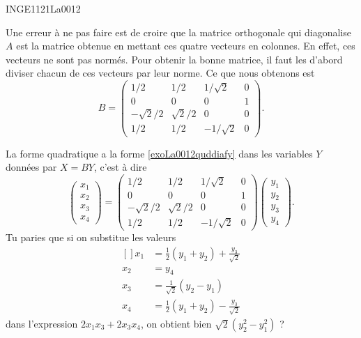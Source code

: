 \begin{corrige}{INGE1121La0012}
\begin{enumerate}
			Une erreur à ne pas faire est de croire que la matrice orthogonale qui diagonalise $A$ est la matrice obtenue en mettant ces quatre vecteurs en colonnes. En effet, ces vecteurs ne sont pas normés. Pour obtenir la bonne matrice, il faut les d'abord diviser chacun de ces vecteurs par leur norme. Ce que nous obtenons est
			\begin{equation}
				B=\begin{pmatrix}
					1/2	&	1/2	&	1/\sqrt{2}	&	0	\\
					 0	&	0	&	0	&	1	\\
					 -\sqrt{2}/2	&	\sqrt{2}/2	&	0	&	0	\\ 
					 1/2	&	1/2	&	-1/\sqrt{2}	&	0	 
				 \end{pmatrix}.
			\end{equation}
			
			La forme quadratique a la forme \eqref{exoLa0012quddiafy} dans les variables $Y$ données par $X=BY$, c'est à dire
			\begin{equation}
				\begin{pmatrix}
					x_1	\\ 
					x_2	\\ 
					x_3	\\ 
					x_4	
				\end{pmatrix}=
				\begin{pmatrix}
					1/2	&	1/2	&	1/\sqrt{2}	&	0	\\
					 0	&	0	&	0	&	1	\\
					 -\sqrt{2}/2	&	\sqrt{2}/2	&	0	&	0	\\ 
					 1/2	&	1/2	&	-1/\sqrt{2}	&	0	 
				 \end{pmatrix}
				 \begin{pmatrix}
					 y_1	\\ 
					 y_2	\\ 
					 y_3	\\ 
					 y_4	
				 \end{pmatrix}.
			\end{equation}
			Tu paries que si on substitue les valeurs
			\begin{equation}
				\begin{aligned}[]
					x_1&=\frac{ 1 }{2}(y_1+y_2)+\frac{ y_3 }{ \sqrt{2} }\\
					x_2&=y_4\\
					x_3&=\frac{1}{ \sqrt{2} }(y_2-y_1)\\
					x_4&=\frac{ 1 }{2}(y_1+y_2)-\frac{ y_3 }{ \sqrt{2} }
				\end{aligned}
			\end{equation}
			dans l'expression $2x_1x_3+2x_3x_4$, on obtient bien $\sqrt{2}(y_2^2-y_1^2)$ ?


\end{enumerate}
\end{corrige}
